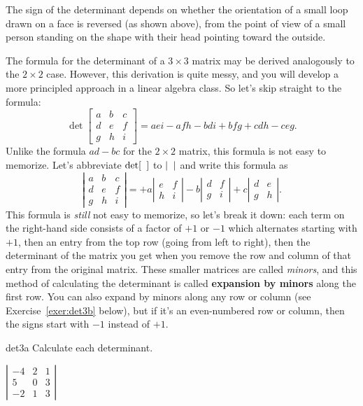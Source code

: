 \documentclass{watsonbook}
\begin{document}
The sign of the determinant depends on whether the orientation of a
small loop drawn on a face is reversed (as shown above), from the
point of view of a small person standing on the shape with their head
pointing toward the outside.

The formula for the determinant of a $3 \times 3$ matrix may be
derived analogously to the $2\times 2$ case. However, this derivation
is quite messy, and you will develop a more principled approach in a
linear algebra class. So let's skip straight to the formula:
\[
\det \left[\begin{array}{ccc} a & b & c \\ d & e & f \\ g & h & i \end{array}\right] = 
aei - afh - bdi + bfg + cdh - ceg. 
\]
Unlike the formula $ad - bc$ for the $2\times 2$ matrix, this formula is not easy to memorize. Let's abbreviate $\det [ \hphantom{a} ]$ to $| \hphantom{a}|$ and write this formula as 
\[
\left|\begin{array}{ccc} a & b & c \\ d & e & f \\ g & h & i \end{array}\right| = 
+a \left|\begin{array}{cc} e & f \\  h & i \end{array}\right| 
-b \left|\begin{array}{cc} d & f \\  g & i \end{array}\right| 
+c \left|\begin{array}{cc} d & e \\  g & h \end{array}\right|. 
\]
This formula is \textit{still} not easy to memorize, so let's break it down: each term on the right-hand side consists of a factor of $+1$ or $-1$ which alternates starting with $+1$, then an entry from the top row (going from left to right), then the determinant of the matrix you get when you remove the row and column of that entry from the original matrix. These smaller matrices are called \textit{minors}, and this method of calculating the determinant is called \textbf{expansion by minors} along the first row. You can also expand by minors along any row or column (see Exercise~\ref{exer:det3b} below), but if it's an even-numbered row or column, then the signs start with $-1$ instead of $+1$. 

\begin{exercise}{}{det3a} \setcounter{subitm}{1}
  Calculate each determinant. 

{$\left|\begin{array}{ccc} -4 & 2 & 1 \\ 5 & 0 & 3 \\ -2 & 1 & 3 \end{array}\right|$}
\end{exercise}
\end{document}
